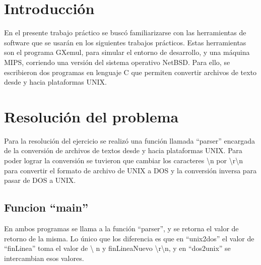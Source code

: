 \documentclass[a4paper,10pt]{article}
\begin{document}

\setcounter{page}{2}

\newpage
\thispagestyle{empty}
\tableofcontents

\newpage
\section{Introducci\'on}
  En el presente trabajo pr\'actico se busc\'o familiarizarse con las
  herramientas de software que se usar\'an en los siguientes trabajos
  pr\'acticos. Estas herramientas son el programa GXemul, para simular el
  entorno de desarrollo, y una m\'aquina MIPS, corriendo una versi\'on del
  sistema operativo NetBSD. Para ello, se escribieron dos programas en
  lenguaje C que permiten convertir archivos de texto desde y hacia
  plataformas UNIX. 

\section{Resoluci\'on del problema}
  Para la resoluci\'on del ejercicio se realiz\'o una funci\'on llamada
  ``parser'' encargada de la conversi\'on de archivos de textos desde y hacia 
  plataformas UNIX. Para poder lograr la conversi\'on se tuvieron que cambiar los caracteres
  \textbackslash n por \textbackslash r\textbackslash n para convertir el formato de archivo de UNIX a DOS y la conversi\'on 
  inversa para pasar de DOS a UNIX. 

  \subsection{Funcion ``main''}
  En ambos programas se llama a la funci\'on ``parser'', y se retorna el valor de  retorno de la misma. Lo
  \'unico que los diferencia es que en ``unix2dos'' el valor de ``finLinea'' toma el valor de \textbackslash
  n y finLineaNuevo \textbackslash r\textbackslash n, y en ``dos2unix'' se intercambian esos valores.
\end{document}
